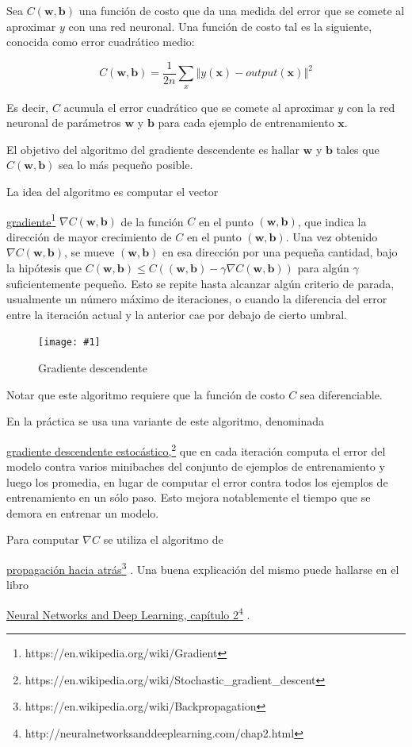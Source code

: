 \documentclass[a4paper, 10pt, twoside]{article}
\newcommand{\img}[3]{
  \begin{figure}[H]
    \begin{center}
      \texttt{[image: \#1]}
    \end{center}
    \caption{#2}
    \label{#3}
  \end{figure}
}
\newcommand{\link}[2]{
  \href{#1}{#2}\footnote{#1}
}
\begin{document}
Sea $C(\bm{w}, \bm{b})$ una función de costo que da una medida del error que se
comete al aproximar $y$ con una red neuronal. Una función de costo tal es la
siguiente, conocida como error cuadrático medio:

$$C(\bm{w}, \bm{b}) = \frac{1}{2n} \sum_x \left\Vert
                                          y(\bm{\bm{x}}) -
                                          \mathit{output}(\bm{x})
                                          \right\Vert^2$$

Es decir, $C$ acumula el error cuadrático que se comete al aproximar $y$ con la
red neuronal de parámetros $\bm{w}$ y $\bm{b}$ para cada ejemplo de
entrenamiento $\bm{x}$.

El objetivo del algoritmo del gradiente descendente es hallar $\bm{w}$ y
$\bm{b}$ tales que $C(\bm{w}, \bm{b})$ sea lo más pequeño posible.

La idea del algoritmo es computar el vector
\link{https://en.wikipedia.org/wiki/Gradient}{gradiente} $\nabla C(\bm{w},
\bm{b})$ de la función $C$ en el punto $(\bm{w}, \bm{b})$, que indica la
dirección de mayor crecimiento de $C$ en el punto $(\bm{w}, \bm{b})$. Una vez
obtenido $\nabla C(\bm{w}, \bm{b})$, se mueve $(\bm{w}, \bm{b})$ en esa
dirección por una pequeña cantidad, bajo la hipótesis que $C(\bm{w}, \bm{b})
\leq C((\bm{w}, \bm{b}) - \gamma \nabla C(\bm{w}, \bm{b}))$ para algún $\gamma$
suficientemente pequeño. Esto se repite hasta alcanzar algún criterio de
parada, usualmente un número máximo de iteraciones, o cuando la diferencia del
error entre la iteración actual y la anterior cae por debajo de cierto umbral.

\img{gradient-descent.png}{Gradiente descendente}{img:gradient-descent}

Notar que este algoritmo requiere que la función de costo $C$ sea diferenciable.

En la práctica se usa una variante de este algoritmo, denominada
\link{https://en.wikipedia.org/wiki/Stochastic_gradient_descent}{gradiente
descendente estocástico,} que en cada iteración computa el error del modelo
contra varios minibaches del conjunto de ejemplos de entrenamiento y luego los
promedia, en lugar de computar el error contra todos los ejemplos de
entrenamiento en un sólo paso. Esto mejora notablemente el tiempo que se demora
en entrenar un modelo.

Para computar $\nabla C$ se utiliza el algoritmo de
\link{https://en.wikipedia.org/wiki/Backpropagation}{propagación hacia atrás}.
Una buena explicación del mismo puede hallarse en el libro
\link{http://neuralnetworksanddeeplearning.com/chap2.html}{Neural Networks and
Deep Learning, capítulo 2}.
\end{document}
